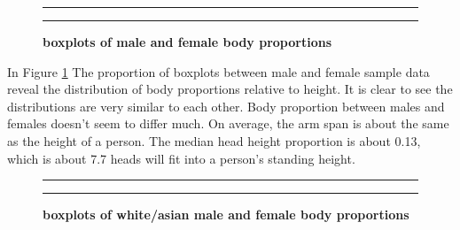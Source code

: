 \documentclass[]{article}
\begin{document}
\begin{figure}[!ht]
    \hrule
    \caption{ \textbf{boxplots of male and female body proportions} }
    \begin{center}
    \end{center}
    \label{fig:proportion.mf}
    \hrule
\end{figure}

\noindent In Figure \ref{fig:proportion.mf} The proportion of boxplots
between male and female sample data reveal the distribution of body
proportions relative to height. It is clear to see the distributions are
very similar to each other. Body proportion between males and females
doesn't seem to differ much. On average, the arm span is about the same
as the height of a person. The median head height proportion is about
0.13, which is about 7.7 heads will fit into a person's standing
height.\vspace{0.25in}

\begin{figure}[!ht]
    \hrule
    \caption{ \textbf{boxplots of white/asian male and female body proportions} }
    \begin{center}
    \end{center}
    \label{fig:prportion.amfwmf}
    \hrule
\end{figure}
\end{document}
